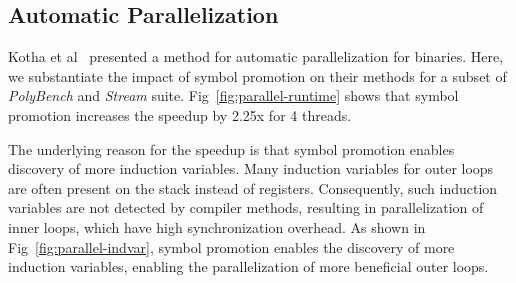 

\subsection{Automatic Parallelization}
Kotha et al~\cite{micro-aparna10} presented a method for automatic parallelization for binaries. Here, we substantiate the impact of symbol promotion on their methods for a subset of \emph{PolyBench} and \emph{Stream} suite. Fig~\ref{fig:parallel-runtime} shows that symbol promotion increases the speedup by 2.25x for 4 threads.

The underlying reason for the speedup is that symbol promotion enables discovery of more induction variables. Many induction variables for outer loops are often present on the stack instead of registers. Consequently, such induction variables are not detected by compiler methods, resulting in parallelization of inner loops, which have high synchronization overhead. As shown in Fig~\ref{fig:parallel-indvar}, symbol promotion enables the discovery of more induction variables, enabling the parallelization of more beneficial outer loops.


